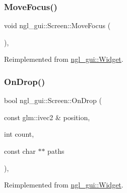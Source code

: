 \mbox{\label{classngl__gui_1_1_screen_a1a74a47ad88de9f75cc87c053eb7d00e}} 
\subsubsection{\texorpdfstring{Move\+Focus()}{MoveFocus()}}
{\footnotesize\ttfamily void ngl\+\_\+gui\+::\+Screen\+::\+Move\+Focus (\begin{DoxyParamCaption}{ }\end{DoxyParamCaption})\hspace{0.3cm}{\ttfamily [override]}, {\ttfamily [virtual]}}



Reimplemented from \mbox{\hyperlink{classngl__gui_1_1_widget_a0e06194379a4760b149d5cf2ba26b360}{ngl\+\_\+gui\+::\+Widget}}.

\mbox{\label{classngl__gui_1_1_screen_a72094220b06b22f1a301295ce4bcfed6}} 
\subsubsection{\texorpdfstring{On\+Drop()}{OnDrop()}}
{\footnotesize\ttfamily bool ngl\+\_\+gui\+::\+Screen\+::\+On\+Drop (\begin{DoxyParamCaption}\item[{const glm\+::ivec2 \&}]{position,  }\item[{int}]{count,  }\item[{const char $\ast$$\ast$}]{paths }\end{DoxyParamCaption})\hspace{0.3cm}{\ttfamily [override]}, {\ttfamily [virtual]}}



Reimplemented from \mbox{\hyperlink{classngl__gui_1_1_widget_a244384eb10f734be4bbd90b440817592}{ngl\+\_\+gui\+::\+Widget}}.

\mbox{\label{classngl__gui_1_1_screen_adaf24551542f162fa02e79ad7f4c9b8d}} 
